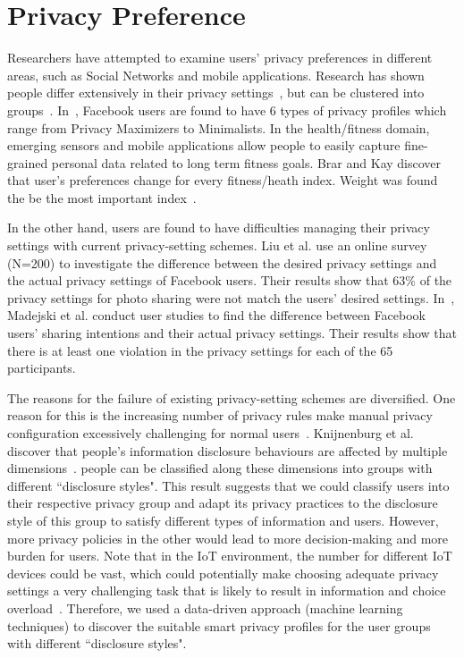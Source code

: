 \section{Privacy Preference}
Researchers have attempted to examine users' privacy preferences in different areas, such as Social Networks and mobile applications. Research has shown people differ extensively in their privacy settings~\cite{olson2005study}, but can be clustered into groups~\cite{anthony2007privacy,knijnenburg2013dimensionality}. In~\cite{wisniewski2014profiling, knijnenburg2017privacy}, Facebook users are found to have 6 types of privacy profiles which range from Privacy Maximizers to Minimalists. In the health/fitness domain, emerging sensors and mobile applications allow people to easily capture fine-grained personal data related to long term fitness goals. Brar and Kay discover that user's preferences change for every fitness/heath index. Weight was found the be the most important index~\cite{brar2004privacy}. 

In the other hand, users are found to have difficulties managing their privacy settings with current privacy-setting schemes. Liu et al. use an online survey (N=200) to investigate the difference between the desired privacy settings and the actual privacy settings of Facebook users. Their results show that 63\% of the privacy settings for photo sharing were not match the users' desired settings. In~\cite{madejski2012study}, Madejski et al. conduct user studies to find the difference between Facebook users’ sharing intentions and their actual privacy settings. Their results show that there is at least one violation in the privacy settings for each of the 65 participants.

The reasons for the failure of existing privacy-setting schemes are diversified. One reason for this is the increasing number of privacy rules make manual privacy configuration excessively challenging for normal users~\cite{furnell2015managing}. Knijnenburg et al. discover that people’s information disclosure behaviours
are affected by multiple dimensions~\cite{knijnenburg2013dimensionality}. people can be classified along these dimensions into groups with different ``disclosure styles". This result suggests that we could classify users into their respective privacy group and adapt its privacy practices to the disclosure style of this group to satisfy different types of information and users. However, more privacy policies in the other would lead to more decision-making and more burden for users. Note that in the IoT environment, the number for different IoT devices could be vast, which could potentially make choosing adequate privacy settings a very challenging task that is likely to result in information and choice overload~\cite{williams2016perfect}. Therefore, we used a data-driven approach (machine learning techniques) to discover the suitable smart privacy profiles for the user groups with different ``disclosure styles".

